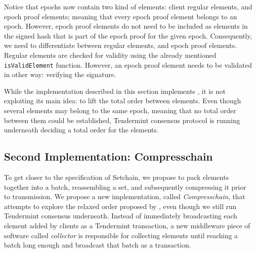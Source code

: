 %
Notice that epochs now contain two kind of elements: client regular elements, and epoch
proof elements; meaning that every epoch proof element belongs to an epoch. However,
epoch proof elements do not need to be included as elements in the signed hash that is
part of the epoch proof for the given epoch.
%
Consequently, we need to differentiate between regular elements, and epoch proof elements.
%
Regular elements are checked for validity using the already mentioned \texttt{isValidElement}
function.
%
However, an epoch proof element needs to be validated in other way: verifying the signature.
%

While the implementation described in this section implements \setchain, it is
not exploiting its main idea: to lift the total order between elements.
%
%
Even though several elements may belong to the same epoch, meaning that no total
order between them could be established, Tendermint consensus protocol is
running underneath deciding a total order for the elements.


\subsection{Second Implementation: Compresschain}\label{subsec:compresschain}

To get closer to the specification of Setchain, we propose to pack elements
together into a batch, reassembling a set, and subsequently compressing it
prior to transmission.
%
We propose a new implementation, called \emph{Compresschain}, that attempts to
explore the relaxed order proposed by \setchain, even though we still run
Tendermint consensus underneath.
%
Instead of immediately broadcasting each element added by clients as a
Tendermint transaction, a new middleware piece of software called
\textit{collector} is responsible for collecting elements until reaching a batch
long enough and broadcast that batch as a transaction.
%
%

